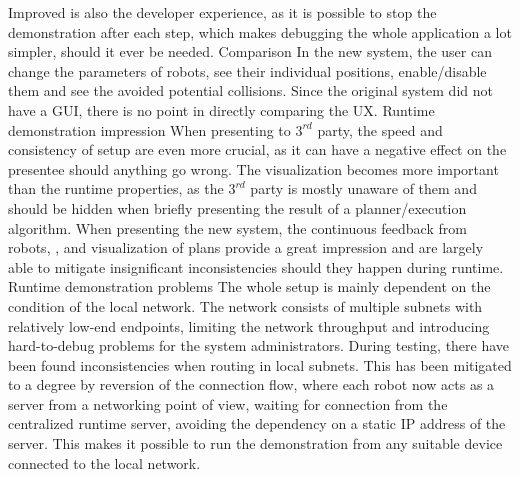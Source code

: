 Improved is also the developer experience, as it is possible to stop the demonstration after each step, which makes debugging the whole application a lot simpler, should it ever be needed.
\secc Comparison
In the new system, the user can change the parameters of robots, see their individual positions, enable/disable them and see the avoided potential collisions. Since the original system did not have a GUI, there is no point in directly comparing the UX. 
\sec Runtime demonstration impression
When presenting to $3^{rd}$ party, the speed and consistency of setup are even more crucial, as it can have a negative effect on the presentee should anything go wrong. The visualization becomes more important than the runtime properties, as the $3^{rd}$ party is mostly unaware of them and should be hidden when briefly presenting the result of a planner/execution algorithm. When presenting the new system, the continuous feedback from robots, {\vicon}, and visualization of plans provide a great impression and are largely able to mitigate insignificant inconsistencies should they happen during runtime.
\sec Runtime demonstration problems
The whole setup is mainly dependent on the condition of the local network. The network consists of multiple subnets with relatively low-end endpoints, limiting the network throughput and introducing hard-to-debug problems for the system administrators. During testing, there have been found inconsistencies when routing in local subnets. This has been mitigated to a degree by reversion of the connection flow, where each robot now acts as a server from a networking point of view, waiting for connection from the centralized runtime server, avoiding the dependency on a static IP address of the server. This makes it possible to run the demonstration from any suitable device connected to the local network.